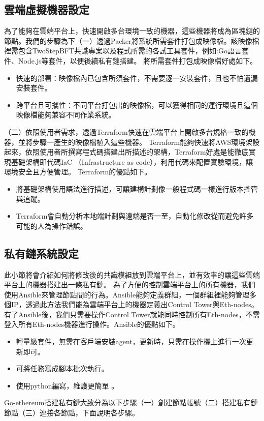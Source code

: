 \subsection{雲端虛擬機器設定}\label{se_5} 
為了能夠在雲端平台上，快速開啟多台環境一致的機器，這些機器將成為區塊鏈的節點。我們的步驟為下（一）透過Packer將系統所需套件打包成映像檔。該映像檔裡需包含TwoStepBFT共識專案以及程式所需的各試工具套件，例如:Go語言套件、Node.js等套件，以便後續私有鏈搭建。
將所需套件打包成映像檔好處如下。
\begin{itemize}%

\item 快速的部署：映像檔內已包含所須套件，不需要逐一安裝套件，且也不怕遺漏安裝套件。

\item 跨平台且可攜性：不同平台打包出的映像檔，可以獲得相同的運行環境且這個映像檔能夠兼容不同作業系統。
\end{itemize}

（二）依照使用者需求，透過Terraform快速在雲端平台上開啟多台規格一致的機器，並將步驟一產生的映像檔植入這些機器。
Terraform能夠快速將AWS環境架設起來，依照使用者所撰寫程式碼搭建出所描述的架構，Terraform好處是能徹底實現基礎架構即代碼IaC （Infrastructure as code），利用代碼來配置實驗環境，讓環境安全且方便管理。
Terraform的優點如下。
\begin{itemize}%

\item 將基礎架構使用語法進行描述，可讓建構計劃像一般程式碼一樣進行版本控管與追蹤。 

\item Terraform會自動分析本地端計劃與遠端是否一至，自動化修改從而避免許多可能的人為操作錯誤。
\end{itemize}

\subsection{私有鏈系統設定}\label{se_5} 
此小節將會介紹如何將修改後的共識模組放到雲端平台上，並有效率的讓這些雲端平台上的機器搭建出一條私有鏈。
為了方便的控制雲端平台上的所有機器，我們使用Ansible來管理節點間的行為。Ansible能夠定義群組，一個群組裡能夠管理多個IP，透過此方法我們能為雲端平台上的機器定義出Control Tower與Eth-nodes。有了Ansible後，我們只需要操作Control Tower就能同時控制所有Eth-nodes，不需登入所有Eth-nodes機器進行操作。Ansible的優點如下。
\begin{itemize}%
\item 輕量級套件，無需在客戶端安裝agent，更新時，只需在操作機上進行一次更新即可。

\item 可將任務寫成腳本批次執行。

\item 使用python編寫，維護更簡單 。
\end{itemize}
Go-ethereum搭建私有鏈大致分為以下步驟（一）創建節點帳號（二）搭建私有鏈節點（三）連接各節點，下面說明各步驟。

